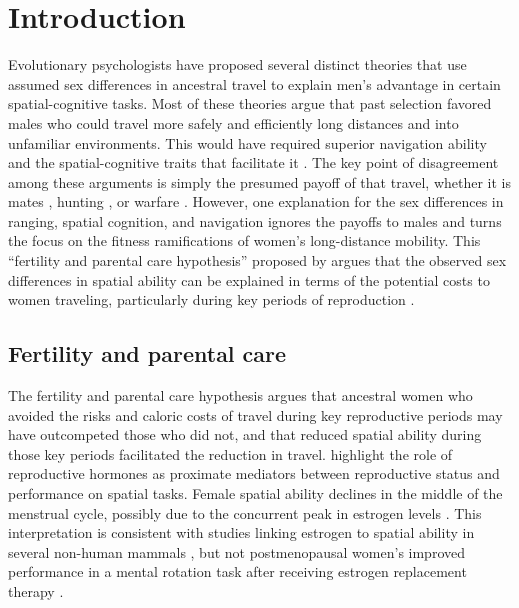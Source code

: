 \section{Introduction}
\label{sec:1}
Evolutionary psychologists have proposed several distinct theories that use assumed sex differences in ancestral travel to explain men's advantage in certain spatial-cognitive tasks.  Most of these theories argue that past selection favored males who could travel more safely and efficiently long distances and into unfamiliar environments.  This would have required superior navigation ability and the spatial-cognitive traits that facilitate it \citep{jones2003evolution}.  The key point of disagreement among these arguments is simply the presumed payoff of that travel, whether it is mates \citep{gaulin1992evolution}, hunting \citep{eals1994hunter}, or warfare \citep{geary1995sexual}.  However, one explanation for the sex differences in ranging, spatial cognition, and navigation ignores the payoffs to males and turns the focus on the fitness ramifications of women's long-distance mobility.  This ``fertility and parental care hypothesis'' proposed by \citet{sherry1997evolution} argues that the observed sex differences in spatial ability can be explained in terms of the potential costs to women traveling, particularly during key periods of reproduction \citep{ecuyer2004have}.

	\subsection{Fertility and parental care}
	\label{sec:1.1}
The fertility and parental care hypothesis argues that ancestral women who avoided the risks and caloric costs of travel during key reproductive periods may have outcompeted those who did not, and that reduced spatial ability during those key periods facilitated  the reduction in travel.  \citet{sherry1997evolution} highlight the role of reproductive hormones as proximate mediators between reproductive status and performance on spatial tasks. Female spatial ability declines in the middle of the menstrual cycle, possibly due to the concurrent peak in estrogen levels \citep{hampson1988reciprocal, hampson1990estrogen, mccormick2001menstrual, komnenich1978gonadal, hausmann2000sex}. This interpretation is consistent with studies linking estrogen to spatial ability in several non-human mammals \citep{lacreuse1999spatial, frye1995estrus}, but not postmenopausal women's improved performance in a mental rotation task after receiving estrogen replacement therapy \citep{duka2000effects}.
	
